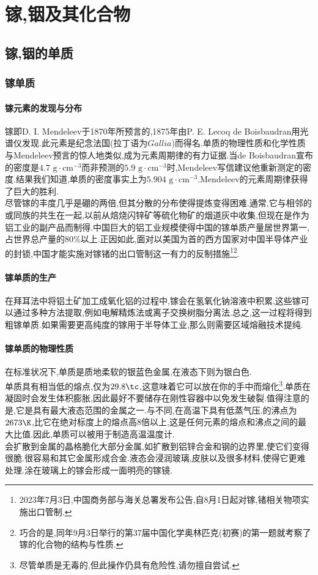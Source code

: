 \documentclass{ctexart}
\begin{document}
\section{镓,铟及其化合物}
\subsection{镓,铟的单质}
\subsubsection{镓单质}
\paragraph{镓元素的发现与分布}
镓即D. I. Mendeleev于1870年所预言的,1875年由P. E. Lecoq de Boisbaudran用光谱仪发现.此元素是纪念法国(拉丁语为$Gallia$)而得名.单质的物理性质和化学性质与Mendeleev预言的惊人地类似,成为元素周期律的有力证据.当de Boisbaudran宣布的密度是$4.7\text{ g}\cdot\text{cm}^{-3}$而非预测的$5.9\text{ g}\cdot\text{cm}^{-3}$时,Mendeleev写信建议他重新测定的密度.结果我们知道,单质的密度事实上为$5.904\text{ g}\cdot\text{cm}^{-3}$.Mendeleev的元素周期律获得了巨大的胜利.\\
\indent 尽管镓的丰度几乎是硼的两倍,但其分散的分布使得提炼变得困难.通常,它与相邻的或同族的共生在一起,以前从焙烧闪锌矿等硫化物矿的烟道灰中收集,但现在是作为铝工业的副产品而制得.中国巨大的铝工业规模使得中国的镓单质产量居世界第一,占世界总产量的$80\%$以上.正因如此,面对以美国为首的西方国家对中国半导体产业的封锁,中国才能实施对镓锗的出口管制这一有力的反制措施\footnote{2023年7月3日,中国商务部与海关总署发布公告,自8月1日起对镓,锗相关物项实施出口管制.}\footnote{巧合的是,同年9月3日举行的第37届中国化学奥林匹克(初赛)的第一题就考察了镓的化合物的结构与性质.}.
\paragraph{镓单质的生产}
在拜耳法中将铝土矿加工成氧化铝的过程中,镓会在氢氧化钠溶液中积累,这些镓可以通过多种方法提取,例如电解精炼法或离子交换树脂分离法.总之,这一过程将得到粗镓单质.如果需要更高纯度的镓用于半导体工业,那么则需要区域熔融技术提纯.
\paragraph{镓单质的物理性质}
在标准状况下,单质是质地柔软的银蓝色金属,在液态下则为银白色.\\
\indent {}单质具有相当低的熔点,仅为$29.8\tc$,这意味着它可以放在你的手中而熔化\footnote{尽管单质是无毒的,但此操作仍具有危险性,请勿擅自尝试.}.单质在凝固时会发生体积膨胀,因此最好不要储存在刚性容器中以免发生破裂.值得注意的是,它是具有最大液态范围的金属之一.与不同,在高温下具有低蒸气压.的沸点为$2673\K$,比它在绝对标度上的熔点高8倍以上,这是任何元素的熔点和沸点之间的最大比值.因此,单质可以被用于制造高温温度计.\\
\indent {}会扩散到金属的晶格脆化大部分金属,如扩散到铝锌合金和钢的边界里,使它们变得很脆.很容易和其它金属形成合金.液态会浸润玻璃,皮肤以及很多材料,使得它更难处理.涂在玻璃上的镓会形成一面明亮的镓镜.
\end{document}
